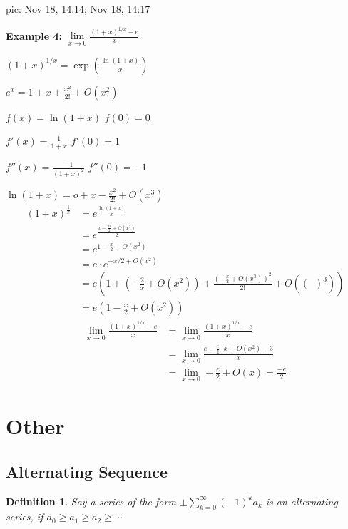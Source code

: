 \documentclass[12pt]{article}
\theoremstyle{plain}
\newtheorem{definition}{Definition}[subsection]
\newcommand{\dlim}{\displaystyle\lim\limits}
\begin{document}
{pic: Nov 18, 14:14;  Nov 18, 14:17


	\textbf{Example 4:}
	 $\dlim_{x\to 0}\frac{(1+x)^{1/x} - e}x $
	 
	 $(1+x)^{1/x} = \exp(\frac{\ln(1+x)}x)$

	 $e^x = 1+x+\frac{x^2}{2!}+O(x^2)$

	 $f(x) = \ln(1+x)$ \qquad $f(0)=0$

	 $f'(x) = \frac1{1+x}$ \qquad $f'(0) = 1$
	 
	 $f''(x) = \frac{-1}{(1+x)^2}$ \qquad $f''(0)=-1$

	 $\ln(1+x) = o + x - \frac{x^2}{2!}+O(x^3)$
	\begin{align*}
		(1+x)^{\frac1x}
		&=e^{\frac{\ln (1+x)}{x}}\\
		&=e^{\frac{x-\frac{x^2}2+O(x^3)}2}\\
		&=e^{1-\frac x2+O(x^2)}\\
		&=e\cdot e^{-x/2+O(x^2)}\\
		&=e(1+(-\frac 2x+O(x^2))+\frac{(-\frac x2+O(x^3))^2}{2!}+O((\,\,\,)^3))\\
		&=e(1-\frac x2+O(x^2))
	\end{align*}
 \begin{align*}
 	 \dlim_{x\to 0}\frac{(1+x)^{1/x} - e}x 
 	 &=\dlim_{x\to 0}\frac{(1+x)^{1/x}-e}x\\
 	 &=\dlim_{x\to 0}\frac{e-\frac e2 \cdot x + O(x^2)-3}x\\
 	 &=\dlim_{x\to 0}-\frac e2 + O(x)=\frac{-e}2
 \end{align*}
}

\newpage
\section{Other}
	\subsection{Alternating Sequence}
	\begin{definition}
		Say a series of the form $\pm \sum_{k=0}^{\infty}(-1)^k a_k$ is 
		an alternating series, if $a_0\geq a_1\geq a_2\geq \cdots$
	\end{definition}
\end{document}
